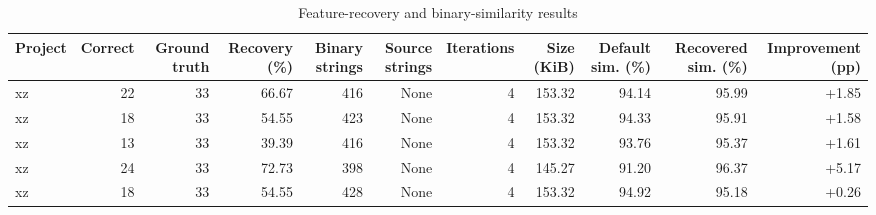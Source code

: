 \begin{table}[htbp]
\centering
\caption{Feature-recovery and binary-similarity results}
\label{tab:feature-recovery-results}
\small
\begin{tabular}{lrrrrrrrrrr}
\toprule
Project & Correct & Ground truth & Recovery (\%) & Binary strings & Source strings & Iterations & Size (KiB) & Default sim. (\%) & Recovered sim. (\%) & Improvement (pp) \\
\midrule
xz & 22 & 33 & 66.67 & 416 & None & 4 & 153.32 & 94.14 & 95.99 & +1.85 \\
xz & 18 & 33 & 54.55 & 423 & None & 4 & 153.32 & 94.33 & 95.91 & +1.58 \\
xz & 13 & 33 & 39.39 & 416 & None & 4 & 153.32 & 93.76 & 95.37 & +1.61 \\
xz & 24 & 33 & 72.73 & 398 & None & 4 & 145.27 & 91.20 & 96.37 & +5.17 \\
xz & 18 & 33 & 54.55 & 428 & None & 4 & 153.32 & 94.92 & 95.18 & +0.26 \\
\bottomrule
\end{tabular}
\end{table}
